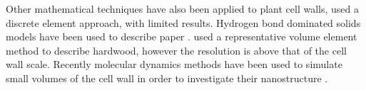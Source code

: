 Other mathematical techniques have also been applied to plant cell walls, \cite{HEPWORTH_1998} used a discrete element approach, with limited results. Hydrogen bond dominated solids models have been used to describe paper \cite{nissan1997link}\cite{batten1987unified}\cite{nissan1987unified}\cite{batten1987unified}. \cite{Zhan_2014} used a representative volume element method to describe hardwood, however the resolution is above that of the cell wall scale. 
Recently molecular dynamics methods have been used to simulate small volumes of the cell wall in order to investigate their nanostructure \cite{jin2015molecular}\cite{Charlier_2012}\cite{Sangha_2011}\cite{Zhang_2009}\cite{houtman1995cellulose}.
